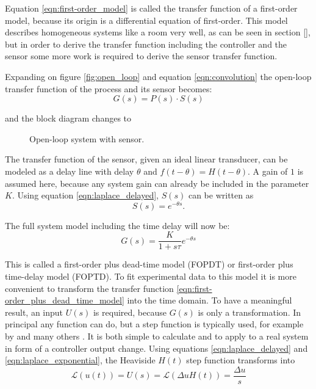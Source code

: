Equation \ref{eqn:first-order_model} is called the transfer function of a first-order model, because its origin is a differential equation of first-order. This model describes homogeneous systems like a room very well, as can be seen in section \ref{}, but in order to derive the transfer function including the controller and the sensor some more work is required to derive the sensor transfer function.

Expanding on figure \ref{fig:open_loop} and equation \ref{eqn:convolution} the open-loop transfer function of the process and its sensor becomes:
\begin{equation}
    G(s) = P(s) \cdot S(s)
\end{equation}

and the block diagram changes to
\begin{figure}[ht]
    \centering
    \caption{Open-loop system with sensor.}
\end{figure}

The transfer function of the sensor, given an ideal linear transducer, can be modeled as a delay line with delay $\theta$ and $f(t-\theta) = H(t-\theta)$. A gain of $1$ is assumed here, because any system gain can already be included in the parameter $K$. Using equation \ref{eqn:laplace_delayed}, $S(s)$ can be written as
\begin{equation}
    S(s) = e^{-\theta s} .
\end{equation}

The full system model including the time delay will now be:
\begin{equation}
    G(s) = \frac{K}{1 + s\tau} e^{-\theta s} \label{eqn:first-order_plus_dead_time_model}
\end{equation}

This is called a first-order plus dead-time model (FOPDT) or first-order plus time-delay model (FOPTD). To fit experimental data to this model it is more convenient to transform the transfer function \ref{eqn:first-order_plus_dead_time_model} into the time domain. To have a meaningful result, an input $U(s)$ is required, because $G(s)$ is only a transformation. In principal any function can do, but a step function is typically used, for example by \citeauthor{ziegler_nichols} \cite{ziegler_nichols} and many others \cite{tuning_rules,pessen_integral,simc,simc_paper,pid_controllers_for_time_delay_systems,pi_stabilization_of_fopdt_systems, pid_basics}. It is both simple to calculate and to apply to a real system in form of a controller output change. Using equations \ref{eqn:laplace_delayed} and \ref{eqn:laplace_exponential}, the Heaviside $H(t)$ step function transforms into
\begin{equation}
    \mathscr{L} \left(u(t) \right) = U(s) = \mathscr{L} \left( \Delta u H(t) \right) = \frac{\Delta u}{s}
\end{equation}

